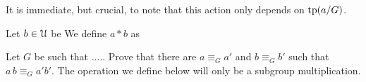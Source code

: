 \documentclass[creche.tex]{subfiles}
\begin{document}
It is immediate, but crucial, to note that this action only depends on ${\rm tp}(a/G)$. 

Let $b\in\EuScript U$ be We define $a*b$ as 


\begin{exercise}\label{ex_group_operation}
Let $G$ be such that ..... Prove that there are $a\equiv_G a'$ and $b\equiv_G b'$ such that $a\,b\equiv_G a'b'$. The operation we define below will only be a subgroup multiplication.\QED
\end{exercise}

% 
% 
% 
% 
% 
% 
\end{document}
